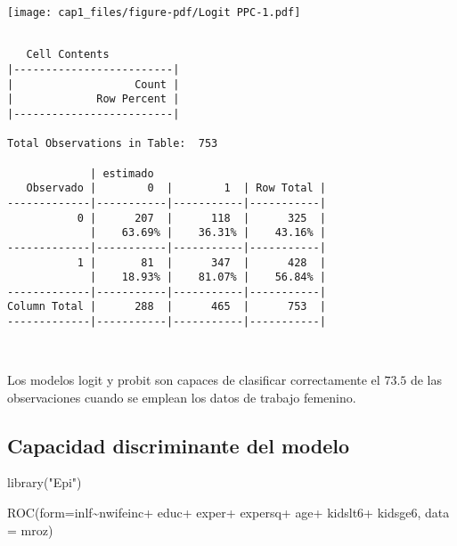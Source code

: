 \documentclass[
  letterpaper,
  DIV=11,
  numbers=noendperiod]{scrreprt}
\newenvironment{Shaded}{\begin{snugshade}}{\end{snugshade}}
\newcommand{\AttributeTok}[1]{\textcolor[rgb]{0.40,0.45,0.13}{#1}}
\newcommand{\DecValTok}[1]{\textcolor[rgb]{0.68,0.00,0.00}{#1}}
\newcommand{\FunctionTok}[1]{\textcolor[rgb]{0.28,0.35,0.67}{#1}}
\newcommand{\NormalTok}[1]{\textcolor[rgb]{0.00,0.23,0.31}{#1}}
\newcommand{\SpecialCharTok}[1]{\textcolor[rgb]{0.37,0.37,0.37}{#1}}
\newcommand{\StringTok}[1]{\textcolor[rgb]{0.13,0.47,0.30}{#1}}
\begin{document}
\texttt{[image: cap1\_files/figure-pdf/Logit PPC-1.pdf]}

\begin{Shaded}
\end{Shaded}

\begin{verbatim}

   Cell Contents
|-------------------------|
|                   Count |
|             Row Percent |
|-------------------------|

Total Observations in Table:  753 

             | estimado 
   Observado |        0  |        1  | Row Total | 
-------------|-----------|-----------|-----------|
           0 |      207  |      118  |      325  | 
             |    63.69% |    36.31% |    43.16% | 
-------------|-----------|-----------|-----------|
           1 |       81  |      347  |      428  | 
             |    18.93% |    81.07% |    56.84% | 
-------------|-----------|-----------|-----------|
Column Total |      288  |      465  |      753  | 
-------------|-----------|-----------|-----------|

 
\end{verbatim}

Los modelos logit y probit son capaces de clasificar correctamente el
\(73.5%
\) de las observaciones cuando se emplean los datos de trabajo femenino.

\subsection{Capacidad discriminante del
modelo}\label{capacidad-discriminante-del-modelo}

\begin{Shaded}
\begin{Highlighting}[]
\FunctionTok{library}\NormalTok{(}\StringTok{"Epi"}\NormalTok{)}

\FunctionTok{ROC}\NormalTok{(}\AttributeTok{form=}\NormalTok{inlf}\SpecialCharTok{\textasciitilde{}}\NormalTok{nwifeinc}\SpecialCharTok{+}
\NormalTok{            educ}\SpecialCharTok{+}
\NormalTok{            exper}\SpecialCharTok{+}
\NormalTok{            expersq}\SpecialCharTok{+}
\NormalTok{            age}\SpecialCharTok{+}
\NormalTok{            kidslt6}\SpecialCharTok{+}
\NormalTok{            kidsge6,}
          \AttributeTok{data =}\NormalTok{ mroz)}
\end{Highlighting}
\end{Shaded}
\end{document}
